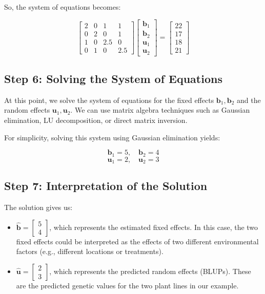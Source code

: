 \documentclass[12pt,a4paper]{article}
\begin{document}
So, the system of equations becomes:

\[
\begin{bmatrix}
    2 & 0 & 1 & 1 \\
    0 & 2 & 0 & 1 \\
    1 & 0 & 2.5 & 0 \\
    0 & 1 & 0 & 2.5
\end{bmatrix}
\begin{bmatrix}
    \mathbf{b}_1 \\
    \mathbf{b}_2 \\
    \mathbf{u}_1 \\
    \mathbf{u}_2
\end{bmatrix}
=
\begin{bmatrix}
    22 \\
    17 \\
    18 \\
    21
\end{bmatrix}
\]

\subsection*{Step 6: Solving the System of Equations}

At this point, we solve the system of equations for the fixed effects $\mathbf{b}_1, \mathbf{b}_2$ and the random effects $\mathbf{u}_1, \mathbf{u}_2$. We can use matrix algebra techniques such as Gaussian elimination, LU decomposition, or direct matrix inversion.

For simplicity, solving this system using Gaussian elimination yields:

\[
\mathbf{b}_1 = 5, \quad \mathbf{b}_2 = 4
\]
\[
\mathbf{u}_1 = 2, \quad \mathbf{u}_2 = 3
\]

\subsection*{Step 7: Interpretation of the Solution}

The solution gives us:
\begin{itemize}
    \item \(\hat{\mathbf{b}} = \begin{bmatrix} 5 \\ 4 \end{bmatrix}\), which represents the estimated fixed effects. In this case, the two fixed effects could be interpreted as the effects of two different environmental factors (e.g., different locations or treatments).
    \item \(\hat{\mathbf{u}} = \begin{bmatrix} 2 \\ 3 \end{bmatrix}\), which represents the predicted random effects (BLUPs). These are the predicted genetic values for the two plant lines in our example.
\end{itemize}
\end{document}
